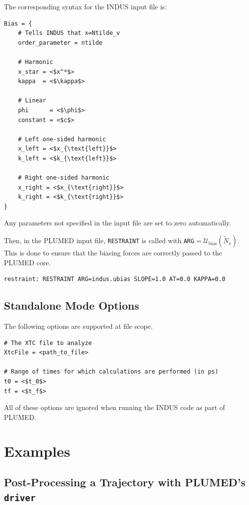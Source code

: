 \documentclass[11pt,notitlepage]{article}
\begin{document}
The corresponding syntax for the INDUS input file is:

\begin{lstlisting}
Bias = {
	# Tells INDUS that x=Ntilde_v
	order_parameter = ntilde

	# Harmonic
	x_star = <$x^*$>
	kappa  = <$\kappa$>

	# Linear
	phi      = <$\phi$>
	constant = <$c$>

	# Left one-sided harmonic
	x_left = <$x_{\text{left}}$>
	k_left = <$k_{\text{left}}$>

	# Right one-sided harmonic
	x_right = <$x_{\text{right}}$>
	k_right = <$k_{\text{right}}$>
}
\end{lstlisting}

\noindent Any parameters not specified in the input file are set to zero automatically.


Then, in the PLUMED input file, \texttt{RESTRAINT} is called with \texttt{ARG}$ = \mathcal{U}_{\text{bias}}(\tilde{N}_v)$. This is done to ensure that the biasing forces are correctly passed to the PLUMED core.

\begin{lstlisting}
restraint: RESTRAINT ARG=indus.ubias SLOPE=1.0 AT=0.0 KAPPA=0.0
\end{lstlisting}


\subsection{Standalone Mode Options}{\label{sec:input_standalone}}

The following options are supported at file scope.

\begin{lstlisting}
# The XTC file to analyze
XtcFile = <path_to_file>

# Range of times for which calculations are performed (in ps)
t0 = <$t_0$>
tf = <$t_f$>
\end{lstlisting}

\noindent All of these options are ignored when running the INDUS code as part of PLUMED.


\section{Examples}


\subsection{Post-Processing a Trajectory with PLUMED's \texttt{driver}}
\end{document}
